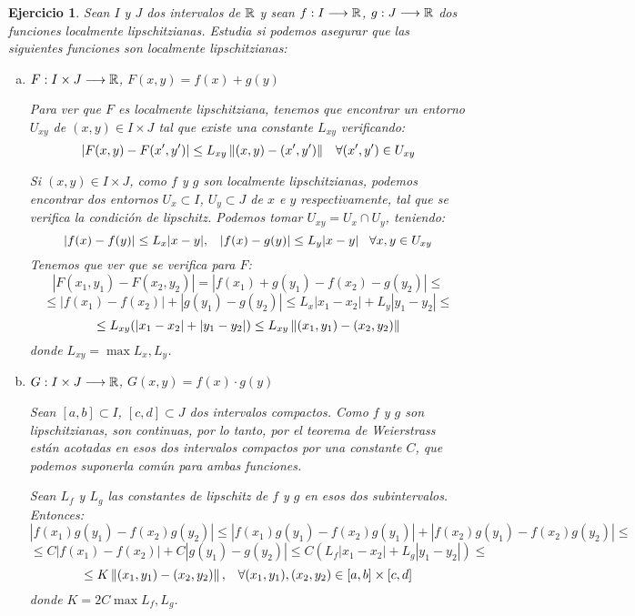 \documentclass[12pt]{article}
\newtheorem{ejercicio}{Ejercicio}
\theoremstyle{definition}
\theoremstyle{remark}
\begin{document}
\begin{ejercicio}
Sean $I$ y $J$ dos intervalos de $\mathbb{R}$ y sean $f : I \longrightarrow \mathbb{R}$, $g : J \longrightarrow \mathbb{R}$ dos funciones localmente lipschitzianas. Estudia si podemos asegurar que las siguientes funciones son localmente lipschitzianas:
\begin{enumerate}[(a)]
\item $F : I\times J \longrightarrow \mathbb{R}$, $F(x,y)=f(x)+g(y)$

Para ver que $F$ es localmente lipschitziana, tenemos que encontrar un entorno $U_{xy}$  de $(x,y)\in I\times J$ tal que existe una constante $L_{xy}$ verificando:
\[
|F(x,y)-F(x',y')|\leq L_{xy}\left\lVert(x,y)-(x',y')\right\rVert \;\;\; \forall (x',y')\in U_{xy}
\]

Si $(x,y)\in I\times J$, como $f$ y $g$ son localmente lipschitzianas, podemos encontrar dos entornos $U_x \subset I$, $U_y\subset J$ de $x$ e $y$ respectivamente, tal que se verifica la condición de lipschitz. Podemos tomar $U_{xy}=U_x\cap U_y$, teniendo:
\[
|f(x)-f(y)|\leq L_{x}|x-y|, \;\;\; |f(x)-g(y)|\leq L_{y}|x-y| \;\;\; \forall x,y\in U_{xy}
\]
Tenemos que ver que se verifica para $F$:
\[
|F(x_1,y_1)-F(x_2,y_2)|=|f(x_1)+g(y_1)-f(x_2)-g(y_2)|\leq
\]
\[
\leq |f(x_1)-f(x_2)|+|g(y_1)-g(y_2)|\leq L_x|x_1-x_2|+L_y|y_1-y_2|\leq
\]
\[
\leq L_{xy}(|x_1-x_2|+|y_1-y_2|)\leq L_{xy}\left\lVert(x_1,y_1)-(x_2,y_2)\right\rVert
\]
donde $L_{xy}=\max{L_x,L_y}$.

\item $G : I\times J \longrightarrow \mathbb{R}$, $G(x,y)=f(x)\cdot g(y)$

Sean $[a,b]\subset I$, $[c,d]\subset J$ dos intervalos compactos. Como $f$ y $g$ son lipschitzianas, son continuas, por lo tanto, por el teorema de Weierstrass están acotadas en esos dos intervalos compactos por una constante $C$, que podemos suponerla común para ambas funciones.

Sean $L_f$ y $L_g$ las constantes de lipschitz de $f$ y $g$ en esos dos subintervalos. Entonces:
\[
|f(x_1)g(y_1)-f(x_2)g(y_2)|\leq |f(x_1)g(y_1)-f(x_2)g(y_1)|+|f(x_2)g(y_1)-f(x_2)g(y_2)|\leq
\]
\[
\leq C|f(x_1)-f(x_2)|+C|g(y_1)-g(y_2)|\leq C\left(L_f|x_1-x_2|+L_g|y_1-y_2|\right)\leq
\]
\[
\leq K\left\lVert(x_1,y_1)-(x_2,y_2)\right\rVert, \;\;\; \forall (x_1,y_1),(x_2,y_2)\in [a,b]\times[c,d] 
\]
donde $K=2C\max{L_f,L_g}$.

\end{enumerate}
\end{ejercicio}
\end{document}
